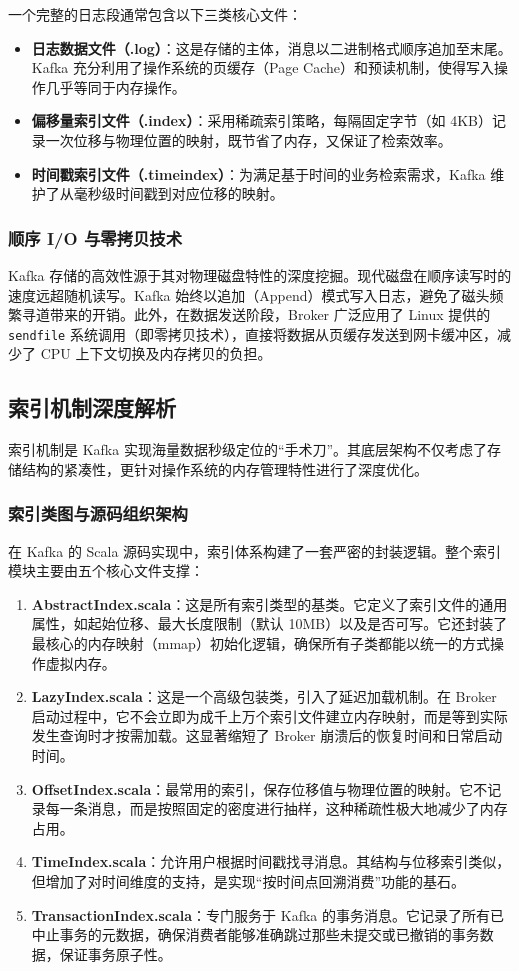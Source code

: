 一个完整的日志段通常包含以下三类核心文件：
\begin{itemize}
    \item \textbf{日志数据文件（.log）}：这是存储的主体，消息以二进制格式顺序追加至末尾。Kafka 充分利用了操作系统的页缓存（Page Cache）和预读机制，使得写入操作几乎等同于内存操作。
    \item \textbf{偏移量索引文件（.index）}：采用稀疏索引策略，每隔固定字节（如 4KB）记录一次位移与物理位置的映射，既节省了内存，又保证了检索效率。
    \item \textbf{时间戳索引文件（.timeindex）}：为满足基于时间的业务检索需求，Kafka 维护了从毫秒级时间戳到对应位移的映射。
\end{itemize}

\subsubsection{顺序 I/O 与零拷贝技术}
Kafka 存储的高效性源于其对物理磁盘特性的深度挖掘。现代磁盘在顺序读写时的速度远超随机读写。Kafka 始终以追加（Append）模式写入日志，避免了磁头频繁寻道带来的开销。此外，在数据发送阶段，Broker 广泛应用了 Linux 提供的 \texttt{sendfile} 系统调用（即零拷贝技术），直接将数据从页缓存发送到网卡缓冲区，减少了 CPU 上下文切换及内存拷贝的负担。

\subsection{索引机制深度解析}
索引机制是 Kafka 实现海量数据秒级定位的“手术刀”。其底层架构不仅考虑了存储结构的紧凑性，更针对操作系统的内存管理特性进行了深度优化。

\subsubsection{索引类图与源码组织架构}
在 Kafka 的 Scala 源码实现中，索引体系构建了一套严密的封装逻辑。整个索引模块主要由五个核心文件支撑：
\begin{enumerate}
    \item \textbf{AbstractIndex.scala}：这是所有索引类型的基类。它定义了索引文件的通用属性，如起始位移、最大长度限制（默认 10MB）以及是否可写。它还封装了最核心的内存映射（mmap）初始化逻辑，确保所有子类都能以统一的方式操作虚拟内存。
    \item \textbf{LazyIndex.scala}：这是一个高级包装类，引入了延迟加载机制。在 Broker 启动过程中，它不会立即为成千上万个索引文件建立内存映射，而是等到实际发生查询时才按需加载。这显著缩短了 Broker 崩溃后的恢复时间和日常启动时间。
    \item \textbf{OffsetIndex.scala}：最常用的索引，保存位移值与物理位置的映射。它不记录每一条消息，而是按照固定的密度进行抽样，这种稀疏性极大地减少了内存占用。
    \item \textbf{TimeIndex.scala}：允许用户根据时间戳找寻消息。其结构与位移索引类似，但增加了对时间维度的支持，是实现“按时间点回溯消费”功能的基石。
    \item \textbf{TransactionIndex.scala}：专门服务于 Kafka 的事务消息。它记录了所有已中止事务的元数据，确保消费者能够准确跳过那些未提交或已撤销的事务数据，保证事务原子性。
\end{enumerate}

